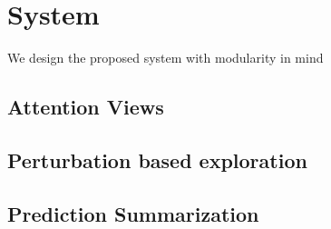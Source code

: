 \section{System}
We design the proposed system with modularity in mind

\subsection{Attention Views}

\subsection{Perturbation based exploration}

\subsection{Prediction Summarization}



